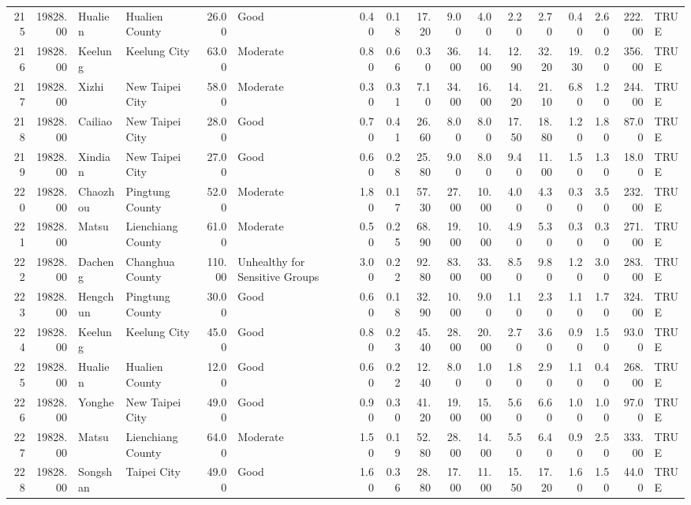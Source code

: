 \begin{table}[ht]
\begin{tabular}{rrllrlrrrrrrrrrrl}
  215 & 19828.00 & Hualien & Hualien County & 26.00 & Good & 0.40 & 0.18 & 17.20 & 9.00 & 4.00 & 2.20 & 2.70 & 0.40 & 2.60 & 222.00 & TRUE \\ 
  216 & 19828.00 & Keelung & Keelung City & 63.00 & Moderate & 0.80 & 0.66 & 0.30 & 36.00 & 14.00 & 12.90 & 32.20 & 19.30 & 0.20 & 356.00 & TRUE \\ 
  217 & 19828.00 & Xizhi & New Taipei City & 58.00 & Moderate & 0.30 & 0.31 & 7.10 & 34.00 & 16.00 & 14.20 & 21.10 & 6.80 & 1.20 & 244.00 & TRUE \\ 
  218 & 19828.00 & Cailiao & New Taipei City & 28.00 & Good & 0.70 & 0.41 & 26.60 & 8.00 & 8.00 & 17.50 & 18.80 & 1.20 & 1.80 & 87.00 & TRUE \\ 
  219 & 19828.00 & Xindian & New Taipei City & 27.00 & Good & 0.60 & 0.28 & 25.80 & 9.00 & 8.00 & 9.40 & 11.00 & 1.50 & 1.30 & 18.00 & TRUE \\ 
  220 & 19828.00 & Chaozhou & Pingtung County & 52.00 & Moderate & 1.80 & 0.17 & 57.30 & 27.00 & 10.00 & 4.00 & 4.30 & 0.30 & 3.50 & 232.00 & TRUE \\ 
  221 & 19828.00 & Matsu & Lienchiang County & 61.00 & Moderate & 0.50 & 0.25 & 68.90 & 19.00 & 10.00 & 4.90 & 5.30 & 0.30 & 0.30 & 271.00 & TRUE \\ 
  222 & 19828.00 & Dacheng & Changhua County & 110.00 & Unhealthy for Sensitive Groups & 3.00 & 0.22 & 92.80 & 83.00 & 33.00 & 8.50 & 9.80 & 1.20 & 3.00 & 283.00 & TRUE \\ 
  223 & 19828.00 & Hengchun & Pingtung County & 30.00 & Good & 0.60 & 0.18 & 32.90 & 10.00 & 9.00 & 1.10 & 2.30 & 1.10 & 1.70 & 324.00 & TRUE \\ 
  224 & 19828.00 & Keelung & Keelung City & 45.00 & Good & 0.80 & 0.23 & 45.40 & 28.00 & 20.00 & 2.70 & 3.60 & 0.90 & 1.50 & 93.00 & TRUE \\ 
  225 & 19828.00 & Hualien & Hualien County & 12.00 & Good & 0.60 & 0.22 & 12.40 & 8.00 & 1.00 & 1.80 & 2.90 & 1.10 & 0.40 & 268.00 & TRUE \\ 
  226 & 19828.00 & Yonghe & New Taipei City & 49.00 & Good & 0.90 & 0.30 & 41.20 & 19.00 & 15.00 & 5.60 & 6.60 & 1.00 & 1.00 & 97.00 & TRUE \\ 
  227 & 19828.00 & Matsu & Lienchiang County & 64.00 & Moderate & 1.50 & 0.19 & 52.80 & 28.00 & 14.00 & 5.50 & 6.40 & 0.90 & 2.50 & 333.00 & TRUE \\ 
  228 & 19828.00 & Songshan & Taipei City & 49.00 & Good & 1.60 & 0.36 & 28.80 & 17.00 & 11.00 & 15.50 & 17.20 & 1.60 & 1.50 & 44.00 & TRUE \\ 

\end{tabular}
\end{table}
